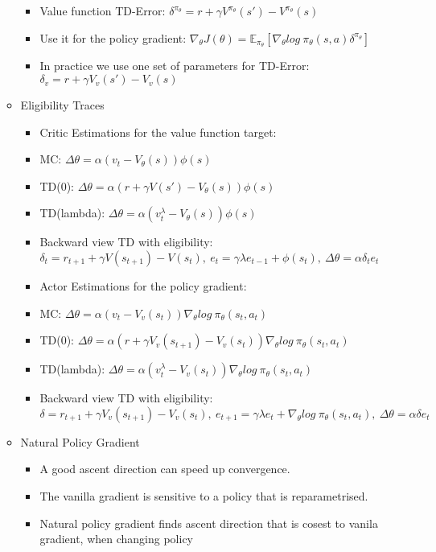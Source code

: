 \begin{itemize}
\begin{itemize}[noitemsep,nolistsep]
\begin{itemize}[noitemsep,nolistsep]
			\item Value function TD-Error: $\delta^{\pi_\theta} = r + \gamma V^{\pi_\theta}(s') - V^{\pi_\theta}(s)$
			\item Use it for the policy gradient: $\nabla_\theta J(\theta) = \mathbb{E}_{\pi_\theta}[\nabla_\theta log\ \pi_\theta(s,a) \delta^{\pi_\theta}]$
			\item In practice we use one set of parameters for TD-Error: $\delta_v = r + \gamma V_v(s') - V_v(s)$
		\end{itemize}
		\item Eligibility Traces
		\begin{itemize}[noitemsep,nolistsep]
			\item Critic Estimations for the value function target:
			\item MC: $\Delta \theta = \alpha(v_t - V_\theta(s))\phi(s)$
			\item TD(0): $\Delta \theta = \alpha(r + \gamma V(s') - V_\theta(s))\phi(s)$
			\item TD(lambda): $\Delta \theta = \alpha(v_t^\lambda - V_\theta(s))\phi(s)$
			\item Backward view TD with eligibility: $\delta_t = r_{t+1} + \gamma V(s_{t+1}) - V(s_t),\ e_t = \gamma \lambda e_{t-1} + \phi(s_t),\ \Delta \theta = \alpha \delta_t e_t$
			\item Actor Estimations for the policy gradient:
			\item MC: $\Delta \theta = \alpha(v_t - V_v(s_t))\nabla_\theta log\ \pi_\theta(s_t,a_t)$
			\item TD(0): $\Delta \theta = \alpha(r + \gamma V_v(s_{t+1}) - V_v(s_t))\nabla_\theta log\ \pi_\theta(s_t,a_t)$
			\item TD(lambda): $\Delta \theta = \alpha(v_t^\lambda - V_v(s_t))\nabla_\theta log\ \pi_\theta(s_t,a_t)$
			\item Backward view TD with eligibility: $\delta = r_{t+1} + \gamma V_v(s_{t+1}) - V_v(s_t),\ e_{t+1} = \gamma \lambda e_t + \nabla_\theta log\ \pi_\theta(s_t,a_t),\ \Delta \theta = \alpha \delta e_t$
		\end{itemize}
		\item Natural Policy Gradient
		\begin{itemize}[noitemsep,nolistsep]
			\item A good ascent direction can speed up convergence.
			\item The vanilla gradient is sensitive to a policy that is reparametrised.
			\item Natural policy gradient finds ascent direction that is cosest to vanila gradient, when changing policy

\end{itemize}
\end{itemize}
\end{itemize}
